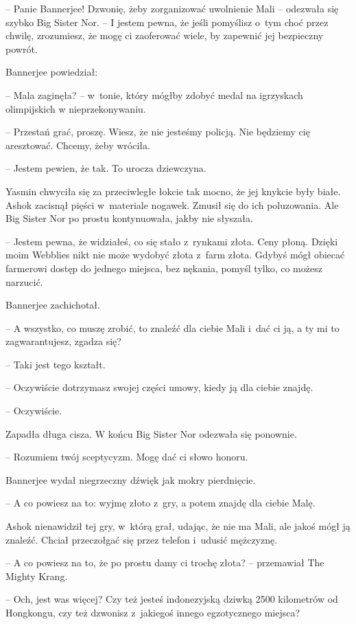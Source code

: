 \documentclass[oneside,polish,11pt,rmheadings]{mwbk}
\begin{document}
-- Panie Bannerjee! Dzwonię, żeby zorganizować uwolnienie Mali -- odezwała się szybko Big Sister Nor. -- I jestem pewna, że jeśli pomyślisz o~tym choć przez chwilę, zrozumiesz, że mogę ci zaoferować wiele, by zapewnić jej bezpieczny powrót.

Bannerjee powiedział: 

-- Mala zaginęła? -- w~tonie, który mógłby zdobyć medal na  igrzyskach olimpijskich w nieprzekonywaniu.

-- Przestań grać, proszę. Wiesz, że nie jesteśmy policją. Nie będziemy cię aresztować. Chcemy, żeby wróciła.

-- Jestem pewien, że tak. To urocza dziewczyna.

Yasmin chwyciła się za przeciwległe łokcie tak mocno, że jej knykcie były białe. Ashok zacisnął pięści w~materiale nogawek. Zmusił się do ich poluzowania. Ale Big Sister Nor po prostu kontynuowała, jakby nie słyszała.

-- Jestem pewna, że widziałeś, co się stało z~rynkami złota. Ceny płoną. Dzięki moim Webblies nikt nie może wydobyć złota z~farm złota. Gdybyś mógł obiecać farmerowi dostęp do jednego miejsca, bez nękania, pomyśl tylko, co możesz narzucić.

Bannerjee zachichotał. 

-- A wszystko, co muszę zrobić, to znaleźć dla ciebie Mali i~dać ci ją, a ty mi to zagwarantujesz, zgadza się?

-- Taki jest tego kształt.

-- Oczywiście dotrzymasz swojej części umowy, kiedy ją dla ciebie znajdę.

-- Oczywiście. 

Zapadła długa cisza. W końcu Big Sister Nor odezwała się ponownie.

-- Rozumiem twój sceptycyzm. Mogę dać ci słowo honoru.

Bannerjee wydał niegrzeczny dźwięk jak mokry pierdnięcie. 

-- A co powiesz na to: wyjmę złoto z~gry, a potem znajdę dla ciebie Malę.

Ashok nienawidził tej gry, w~którą grał, udając, że nie ma Mali, ale jakoś mógł ją znaleźć. Chciał przeczołgać się przez telefon i~udusić mężczyznę.

-- A co powiesz na to, że po prostu damy ci trochę złota? -- przemawiał The Mighty Krang.

-- Och, jest was więcej? Czy też jesteś indonezyjską dziwką 2500 kilometrów od Hongkongu, czy też dzwonisz z~jakiegoś innego egzotycznego miejsca? 
\end{document}
